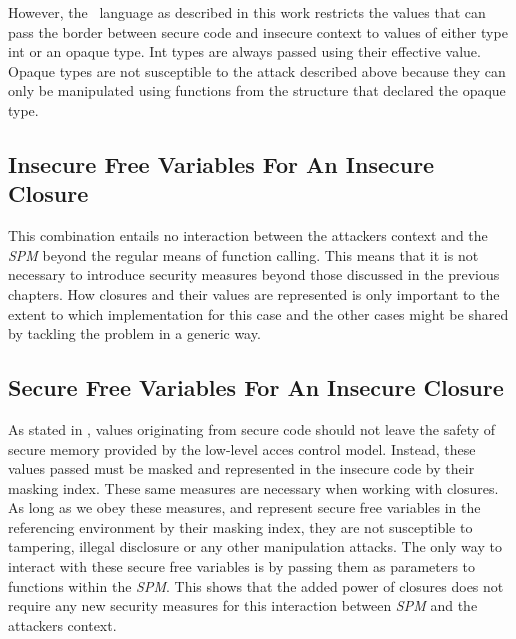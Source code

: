 However, the \MiniML\ language as described in this work restricts the values that can pass the border between secure code and insecure context to values of either type int or an opaque  type.
Int types are always passed using their effective value.
Opaque types are not susceptible to the attack described above because they can only be manipulated using functions from the structure that declared the opaque type.




\subsection{Insecure Free Variables For An Insecure Closure}

This combination entails no interaction between the attackers context and the \emph{SPM} beyond the regular means of function calling.
This means that it is not necessary to introduce security measures beyond those discussed in the previous chapters.
How closures and their values are represented is only important to the extent to which implementation for this case and the other cases might be shared by tackling the problem in a generic way.

\subsection{Secure Free Variables For An Insecure Closure}

As stated in , values originating from secure code should not leave the safety of secure memory provided by the low-level acces control model.
Instead, these values passed must be masked and represented in the insecure code by their masking index.
These same measures are necessary when working with closures.
As long as we obey these measures, and represent secure free variables in the referencing environment by their masking index, they are not susceptible to tampering, illegal disclosure or any other manipulation attacks.
The only way to interact with these secure free variables is by passing them as parameters to functions within the \emph{SPM}.
This shows that the added power of closures does not require any new security measures for this interaction between \emph{SPM} and the attackers context.

